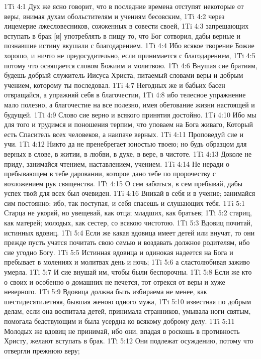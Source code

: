 1Ti 4:1  Дух же ясно говорит, что в последние времена отступят некоторые от веры, внимая духам обольстителям и учениям бесовским,
1Ti 4:2  через лицемерие лжесловесников, сожженных в совести своей,
1Ti 4:3  запрещающих вступать в брак [и] употреблять в пищу то, что Бог сотворил, дабы верные и познавшие истину вкушали с благодарением.
1Ti 4:4  Ибо всякое творение Божие хорошо, и ничто не предосудительно, если принимается с благодарением,
1Ti 4:5  потому что освящается словом Божиим и молитвою.
1Ti 4:6  Внушая сие братиям, будешь добрый служитель Иисуса Христа, питаемый словами веры и добрым учением, которому ты последовал.
1Ti 4:7  Негодных же и бабьих басен отвращайся, а упражняй себя в благочестии,
1Ti 4:8  ибо телесное упражнение мало полезно, а благочестие на все полезно, имея обетование жизни настоящей и будущей.
1Ti 4:9  Слово сие верно и всякого принятия достойно.
1Ti 4:10  Ибо мы для того и трудимся и поношения терпим, что уповаем на Бога живаго, Который есть Спаситель всех человеков, а наипаче верных.
1Ti 4:11  Проповедуй сие и учи.
1Ti 4:12  Никто да не пренебрегает юностью твоею; но будь образцом для верных в слове, в житии, в любви, в духе, в вере, в чистоте.
1Ti 4:13  Доколе не приду, занимайся чтением, наставлением, учением.
1Ti 4:14  Не неради о пребывающем в тебе даровании, которое дано тебе по пророчеству с возложением рук священства.
1Ti 4:15  О сем заботься, в сем пребывай, дабы успех твой для всех был очевиден.
1Ti 4:16  Вникай в себя и в учение; занимайся сим постоянно: ибо, так поступая, и себя спасешь и слушающих тебя.
1Ti 5:1  Старца не укоряй, но увещевай, как отца; младших, как братьев;
1Ti 5:2  стариц, как матерей; молодых, как сестер, со всякою чистотою.
1Ti 5:3  Вдовиц почитай, истинных вдовиц.
1Ti 5:4  Если же какая вдовица имеет детей или внучат, то они прежде пусть учатся почитать свою семью и воздавать должное родителям, ибо сие угодно Богу.
1Ti 5:5  Истинная вдовица и одинокая надеется на Бога и пребывает в молениях и молитвах день и ночь;
1Ti 5:6  а сластолюбивая заживо умерла.
1Ti 5:7  И сие внушай им, чтобы были беспорочны.
1Ti 5:8  Если же кто о своих и особенно о домашних не печется, тот отрекся от веры и хуже неверного.
1Ti 5:9  Вдовица должна быть избираема не менее, как шестидесятилетняя, бывшая женою одного мужа,
1Ti 5:10  известная по добрым делам, если она воспитала детей, принимала странников, умывала ноги святым, помогала бедствующим и была усердна ко всякому доброму делу.
1Ti 5:11  Молодых же вдовиц не принимай, ибо они, впадая в роскошь в противность Христу, желают вступать в брак.
1Ti 5:12  Они подлежат осуждению, потому что отвергли прежнюю веру;
